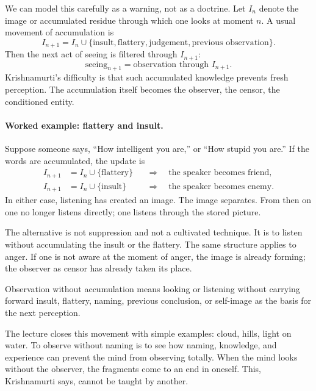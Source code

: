 We can model this carefully as a warning, not as a doctrine. Let $I_n$ denote the image or accumulated residue through which one looks at moment $n$. A usual movement of accumulation is
\begin{equation}
I_{n+1}=I_n\cup\{\text{insult},\text{flattery},\text{judgement},\text{previous observation}\}.
\end{equation}
Then the next act of seeing is filtered through $I_{n+1}$:
\begin{equation}
\text{seeing}_{n+1}
=
\text{observation through } I_{n+1}.
\end{equation}
Krishnamurti's difficulty is that such accumulated knowledge prevents fresh perception. The accumulation itself becomes the observer, the censor, the conditioned entity.

\paragraph{Worked example: flattery and insult.}
Suppose someone says, ``How intelligent you are,'' or ``How stupid you are.'' If the words are accumulated, the update is
\begin{align}
I_{n+1}
&= I_n \cup \{\text{flattery}\}
&&\Longrightarrow\quad \text{the speaker becomes friend},\\
I_{n+1}
&= I_n \cup \{\text{insult}\}
&&\Longrightarrow\quad \text{the speaker becomes enemy}.
\end{align}
In either case, listening has created an image. The image separates. From then on one no longer listens directly; one listens through the stored picture.

The alternative is not suppression and not a cultivated technique. It is to listen without accumulating the insult or the flattery. The same structure applies to anger. If one is not aware at the moment of anger, the image is already forming; the observer as censor has already taken its place.

\begin{definition}
Observation without accumulation means looking or listening without carrying forward insult, flattery, naming, previous conclusion, or self-image as the basis for the next perception.
\end{definition}

The lecture closes this movement with simple examples: cloud, hills, light on water. To observe without naming is to see how naming, knowledge, and experience can prevent the mind from observing totally. When the mind looks without the observer, the fragments come to an end in oneself. This, Krishnamurti says, cannot be taught by another.

